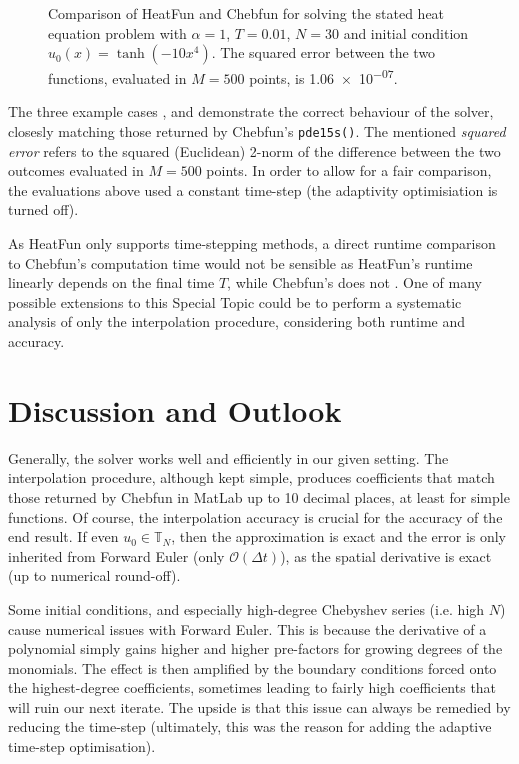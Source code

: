 \documentclass[12pt, a4paper]{article}
\newcommand{\chebyshev}{Chebyshev\xspace}
\newcommand{\heatfun}{\textcolor{themecolor3}{HeatFun}\xspace}
\begin{document}
  \begin{figure}[H]
    \centering
    \caption{Comparison of \heatfun and Chebfun for solving the stated heat equation problem with $\alpha = 1$, $T = 0.01$, $N = 30$ and initial condition $u_0(x) = \tanh(-10x^4)$. The squared error between the two functions, evaluated in $M = 500$ points, is \num{1.06e-07}.}
    \label{fig:example3}
  \end{figure}

  The three example cases ,  and  demonstrate the correct behaviour of the solver, closesly matching those returned by Chebfun's \texttt{pde15s()}. The mentioned \textit{squared error} refers to the squared (Euclidean) 2-norm of the difference between the two outcomes evaluated in $M = 500$ points.
  In order to allow for a fair comparison, the evaluations above used a constant time-step (the adaptivity optimisiation is turned off).

  As \heatfun only supports time-stepping methods, a direct runtime comparison to Chebfun's computation time would not be sensible as \heatfun's runtime linearly depends on the final time $T$, while Chebfun's does not \parencite{chebfun-guide}.
  One of many possible extensions to this Special Topic could be to perform a systematic analysis of only the interpolation procedure, considering both runtime and accuracy.

  \pagebreak
  \section{Discussion and Outlook}
  Generally, the solver works well and efficiently in our given setting.
  The interpolation procedure, although kept simple, produces coefficients that match those returned by Chebfun in MatLab up to 10 decimal places, at least for simple functions.
  Of course, the interpolation accuracy is crucial for the accuracy of the end result.
  If even $u_0 \in \mathbb{T}_N$, then the approximation is exact and the error is only inherited from Forward Euler (only $\mathcal{O}(\Delta t)$), as the spatial derivative is exact (up to numerical round-off).

  Some initial conditions, and especially high-degree \chebyshev series (i.e. high $N$) cause numerical issues with Forward Euler.
  This is because the derivative of a polynomial simply gains higher and higher pre-factors for growing degrees of the monomials.
  The effect is then amplified by the boundary conditions forced onto the highest-degree coefficients, sometimes leading to fairly high coefficients that will ruin our next iterate.
  The upside is that this issue can always be remedied by reducing the time-step (ultimately, this was the reason for adding the adaptive time-step optimisation).
\end{document}
